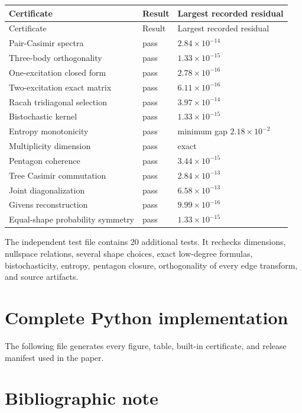 \documentclass[11pt,openany]{report}
\theoremstyle{definition}
\theoremstyle{remark}
\begin{document}
\begin{longtable}{L{0.50\textwidth}L{0.18\textwidth}L{0.22\textwidth}}
\toprule
Certificate & Result & Largest recorded residual\\
\midrule
\endfirsthead
\toprule
Certificate & Result & Largest recorded residual\\
\midrule
\endhead
Pair-Casimir spectra & pass & $2.84\times10^{-14}$\\
Three-body orthogonality & pass & $1.33\times10^{-15}$\\
One-excitation closed form & pass & $2.78\times10^{-16}$\\
Two-excitation exact matrix & pass & $6.11\times10^{-16}$\\
Racah tridiagonal selection & pass & $3.97\times10^{-14}$\\
Bistochastic kernel & pass & $1.33\times10^{-15}$\\
Entropy monotonicity & pass & minimum gap $2.18\times10^{-2}$\\
Multiplicity dimension & pass & exact\\
Pentagon coherence & pass & $3.44\times10^{-15}$\\
Tree Casimir commutation & pass & $2.84\times10^{-13}$\\
Joint diagonalization & pass & $6.58\times10^{-13}$\\
Givens reconstruction & pass & $9.99\times10^{-16}$\\
Equal-shape probability symmetry & pass & $1.33\times10^{-15}$\\
\bottomrule
\end{longtable}

The independent test file contains 20 additional tests. It rechecks dimensions, nullspace relations, several shape choices, exact low-degree formulas, bistochasticity, entropy, pentagon closure, orthogonality of every edge transform, and source artifacts.

\chapter{Complete Python implementation}

The following file generates every figure, table, built-in certificate, and release manifest used in the paper.



\chapter{Bibliographic note}
\end{document}
